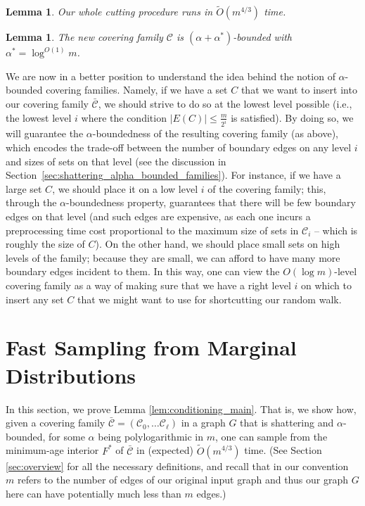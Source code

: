 \documentclass[11pt, letterpaper]{article}
\newtheorem{lemma}[theorem]{Lemma}
\newcommand{\cC}{\mathcal{C}}
\newcommand{\ocC}{\bar{\mathcal{C}}}
\newcommand{\tO}{\widetilde{O}}
\begin{document}
\begin{lemma} \label{lem:partitioning_running_time}
Our whole cutting procedure runs in $\tO(m^{4/3 })$ time.
\end{lemma}

\begin{lemma} \label{lem:partitioning_alpha_boundedness}
The new covering family $\cC$ is $(\alpha + \alpha^*)$-bounded with $\alpha^* = \log^{O(1)}m$.
\end{lemma}


We are now in a better position to understand the idea behind the notion of $\alpha$-bounded covering families. Namely, if we have a set $C$ that we want to insert into our covering family $\ocC$, we should strive to do so at the lowest level possible (i.e., the lowest level $i$ where the condition $|E(C)| \le \frac{m}{2^i}$ is satisfied). By doing so, we will guarantee the $\alpha$-boundedness of the resulting covering family (as above), which encodes the trade-off between the number of boundary edges on any level $i$ and sizes of sets on that level (see the discussion in Section~\ref{sec:shattering_alpha_bounded_families}). For instance, if we have a large set $C$, we should place it on a low level $i$ of the covering family; this, through the $\alpha$-boundedness property, guarantees that there will be few boundary edges on that level (and such edges are expensive, as each one incurs a preprocessing time cost proportional to the maximum size of sets in $\cC_i$ -- which is roughly the size of $C$). On the other hand, we should place small sets on high levels of the family; because they are small, we can afford to have many more boundary edges incident to them.
In this way, one can view the $O(\log m)$-level covering family as a way of making sure that we have a right level $i$ on which to insert any set $C$ that we might want to use for shortcutting our random walk.
 \section{Fast Sampling from Marginal Distributions} \label{sec:sampling} 

In this section, we prove Lemma \ref{lem:conditioning_main}. That is, we show how, given a covering family $\ocC=(\cC_0,\ldots \cC_{\ell})$ in a graph $G$ that is shattering and $\alpha$-bounded, for some $\alpha$ being polylogarithmic in $m$, one can sample from the minimum-age interior $F^*$ of $\ocC$ in (expected) $\tO(m^{4/3})$ time. (See Section \ref{sec:overview} for all the necessary definitions, and recall that in our convention $m$ refers to the number of edges of our original input graph and thus our graph $G$ here can have potentially much less than $m$ edges.)
\end{document}
